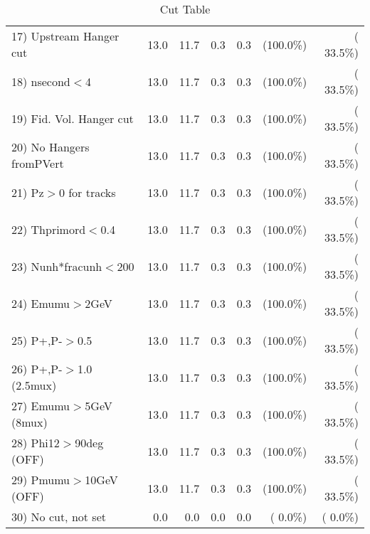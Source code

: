 \begin{table}[h!]
\begin{tabular}{||l||r|r|r|r|r|r||}
 17) Upstream Hanger cut  &         13.0 &         11.7 &          0.3 &          0.3 & (100.0\%) & ( 33.5\%) \\
 18) nsecond$<$4          &         13.0 &         11.7 &          0.3 &          0.3 & (100.0\%) & ( 33.5\%) \\
 19) Fid. Vol. Hanger cut &         13.0 &         11.7 &          0.3 &          0.3 & (100.0\%) & ( 33.5\%) \\
 20) No Hangers fromPVert &         13.0 &         11.7 &          0.3 &          0.3 & (100.0\%) & ( 33.5\%) \\
 21) Pz$>$0 for tracks    &         13.0 &         11.7 &          0.3 &          0.3 & (100.0\%) & ( 33.5\%) \\
 22) Thprimord$<$0.4      &         13.0 &         11.7 &          0.3 &          0.3 & (100.0\%) & ( 33.5\%) \\
 23) Nunh*fracunh$<$200   &         13.0 &         11.7 &          0.3 &          0.3 & (100.0\%) & ( 33.5\%) \\
 24) Emumu$>$2GeV         &         13.0 &         11.7 &          0.3 &          0.3 & (100.0\%) & ( 33.5\%) \\
 25) P+,P-$>$0.5          &         13.0 &         11.7 &          0.3 &          0.3 & (100.0\%) & ( 33.5\%) \\
 26) P+,P-$>$1.0 (2.5mux) &         13.0 &         11.7 &          0.3 &          0.3 & (100.0\%) & ( 33.5\%) \\
 27) Emumu$>$5GeV  (8mux) &         13.0 &         11.7 &          0.3 &          0.3 & (100.0\%) & ( 33.5\%) \\
 28) Phi12$>$90deg  (OFF) &         13.0 &         11.7 &          0.3 &          0.3 & (100.0\%) & ( 33.5\%) \\
 29) Pmumu$>$10GeV  (OFF) &         13.0 &         11.7 &          0.3 &          0.3 & (100.0\%) & ( 33.5\%) \\
 30) No cut, not set      &          0.0 &          0.0 &          0.0 &          0.0 & (  0.0\%) & (  0.0\%) \\
 \hline
 \hline
 \end{tabular}
 \caption{Cut Table           }
 \label{tab-cutheavy_neutrino_4.000}
 \end{table}
